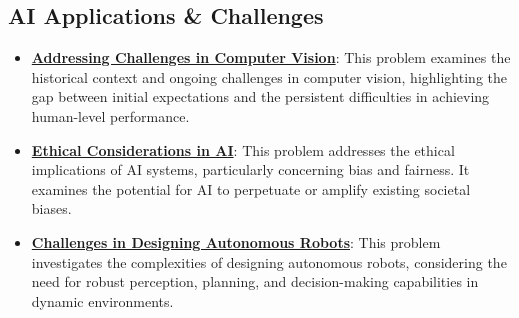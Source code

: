 \documentclass{article}%
\begin{document}
%
\subsection{AI Applications \& Challenges}%
\label{subsec:AIApplicationsChallenges}%
\begin{itemize}[leftmargin=*]%
\item \href{\url{https://purdue.brightspace.com/d2l/common/assets/pdfjs-d2l-dist/1.0.14-legacy/web/viewer.html?file=\%252Fcontent\%252Fenforced\%252F1095467-wl.202510.CS.24300.001\%252F02L2-Intro.pdf\%253Fou\%253D1095467\&lang=en-us\&container=d2l-fileviewer-rendered-pdf\&fullscreen=d2l-fileviewer-rendered-pdf-dialog\&height=667}#page=15}{\textbf{Addressing Challenges in Computer Vision}}: This problem examines the historical context and ongoing challenges in computer vision, highlighting the gap between initial expectations and the persistent difficulties in achieving human-level performance.%
\item \href{\url{https://purdue.brightspace.com/d2l/common/assets/pdfjs-d2l-dist/1.0.14-legacy/web/viewer.html?file=\%252Fcontent\%252Fenforced\%252F1095467-wl.202510.CS.24300.001\%252F02L2-Intro.pdf\%253Fou\%253D1095467\&lang=en-us\&container=d2l-fileviewer-rendered-pdf\&fullscreen=d2l-fileviewer-rendered-pdf-dialog\&height=667}#page=20}{\textbf{Ethical Considerations in AI}}: This problem addresses the ethical implications of AI systems, particularly concerning bias and fairness. It examines the potential for AI to perpetuate or amplify existing societal biases.%
\item \href{\url{https://purdue.brightspace.com/d2l/common/assets/pdfjs-d2l-dist/1.0.14-legacy/web/viewer.html?file=\%252Fcontent\%252Fenforced\%252F1095467-wl.202510.CS.24300.001\%252F02L2-Intro.pdf\%253Fou\%253D1095467\&lang=en-us\&container=d2l-fileviewer-rendered-pdf\&fullscreen=d2l-fileviewer-rendered-pdf-dialog\&height=667}#page=25}{\textbf{Challenges in Designing Autonomous Robots}}: This problem investigates the complexities of designing autonomous robots, considering the need for robust perception, planning, and decision-making capabilities in dynamic environments.%
\end{itemize}

%
\end{document}
